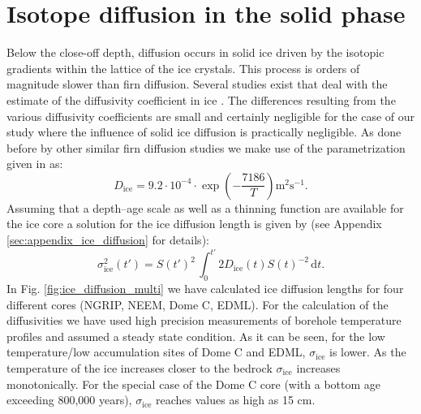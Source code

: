 \documentclass[11pt, draftcls, onecolumn]{IEEEtran} %
\numberwithin{equation}{section}
\numberwithin{table}{section}
\numberwithin{figure}{section}
\begin{document}
\section{Isotope diffusion in the solid phase}
\label{ice_diffusion_section}
Below the close-off depth, diffusion occurs in solid ice driven by the isotopic
gradients within the lattice of the ice crystals. 
This process is orders of magnitude slower than firn diffusion.
Several studies exist that deal with the estimate of the diffusivity 
coefficient in ice \citep{Blicks1966, Delibaltas1966, Itagaki1964, Livingston1997, Ramseier1967}.
The differences resulting from the various diffusivity coefficients are small and certainly
negligible for the case of our study where the influence of solid ice diffusion is practically negligible.
As done before by other similar firn diffusion studies \citep{Johnsen2000, Simonsen2011, Gkinis2014}
we make use of the parametrization given in \cite{Ramseier1967} as:
\begin{equation}
D_{\mathrm{ice}} = 9.2 \cdot 10^{-4} \cdot \exp \left(- \frac{7186}{T} \right) \mathrm{ m^2 s^{-1}} . 
\label{eq.icediffusivity}
\end{equation}
Assuming that a depth--age scale as well as a thinning function are available for the 
ice core a solution for the ice diffusion length is given by (see Appendix \ref{sec:appendix_ice_diffusion} for details):
\begin{equation}
\sigma_{\mathrm{ice}}^2 \!\left( t' \right) = 
S\! \left( t' \right)^2 \,\int_0^{t'} 2 D_{\mathrm{ice}} \!\left( t \right) S \!\left( t \right) ^{-2} \,\mathrm{d} t.
\label{eq.icediffusion}
\end{equation}
In Fig. \ref{fig:ice_diffusion_multi} we have calculated ice diffusion lengths for four different cores (NGRIP, NEEM, Dome C, EDML).
For the calculation of the diffusivities we have used high precision measurements of 
borehole temperature profiles and assumed a steady state condition. 
As it can be seen, for the low temperature/low accumulation sites of Dome C and EDML, $\sigma_{\mathrm{ice}}$
is lower. As the temperature of the ice increases closer to the bedrock $\sigma_{\mathrm{ice}}$ increases monotonically.
For the special case of the Dome C core (with a bottom age exceeding 800,000 years), $\sigma_{\mathrm{ice}}$
reaches values as high as 15 $\mathrm{cm}$.
\end{document}

